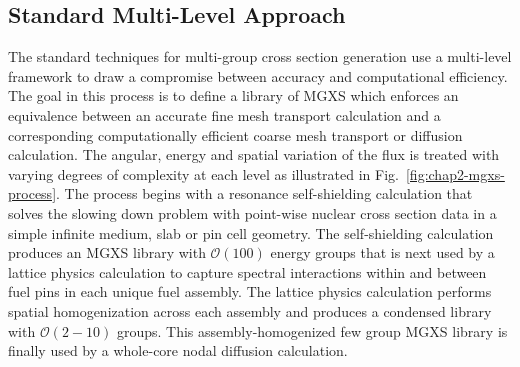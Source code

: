

\subsection{Standard Multi-Level Approach}
\label{subsec:chap2-mgxs-lib-std-approach}

The standard techniques for multi-group cross section generation use a multi-level framework to draw a compromise between accuracy and computational efficiency. The goal in this process is to define a library of \ac{MGXS} which enforces an equivalence between an accurate fine mesh transport calculation and a corresponding computationally efficient coarse mesh transport or diffusion calculation. The angular, energy and spatial variation of the flux is treated with varying degrees of complexity at each level as illustrated in Fig.~\ref{fig:chap2-mgxs-process}. The process begins with a resonance self-shielding calculation that solves the slowing down problem with point-wise nuclear cross section data in a simple infinite medium, slab or pin cell geometry. The self-shielding calculation produces an \ac{MGXS} library with $\mathcal{O}(100)$ energy groups that is next used by a lattice physics calculation to capture spectral interactions within and between fuel pins in each unique fuel assembly. The lattice physics calculation performs spatial homogenization across each assembly and produces a condensed library with $\mathcal{O}(2-10)$ groups. This assembly-homogenized few group \ac{MGXS} library is finally used by a whole-core nodal diffusion calculation.

